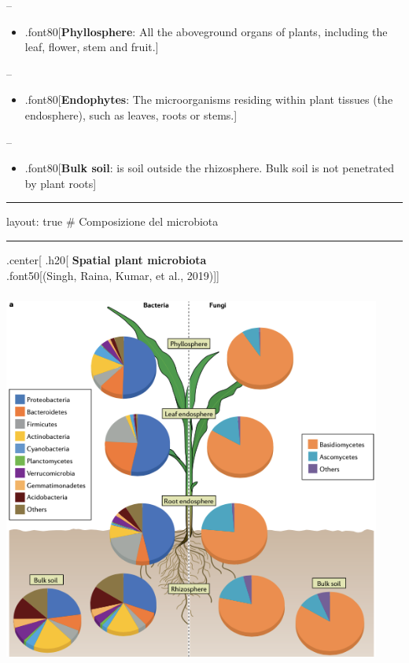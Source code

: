 \documentclass[
]{article}
\providecommand{\tightlist}{%
  \setlength{\itemsep}{0pt}\setlength{\parskip}{0pt}}
\begin{document}
--

\begin{itemize}
\tightlist
\item
  .font80{[}\textbf{Phyllosphere}: All the aboveground organs of plants,
  including the leaf, flower, stem and fruit.{]}
\end{itemize}

--

\begin{itemize}
\tightlist
\item
  .font80{[}\textbf{Endophytes}: The microorganisms residing within
  plant tissues (the endosphere), such as leaves, roots or stems.{]}
\end{itemize}

--

\begin{itemize}
\tightlist
\item
  .font80{[}\textbf{Bulk soil}: is soil outside the rhizosphere. Bulk
  soil is not penetrated by plant roots{]}
\end{itemize}

\begin{center}\rule{0.5\linewidth}{0.5pt}\end{center}

layout: true \# Composizione del microbiota

\begin{center}\rule{0.5\linewidth}{0.5pt}\end{center}

.center{[} .h20{[} \textbf{Spatial plant microbiota}\\
.font50{[}(Singh, Raina, Kumar, et al., 2019){]}{]}

\begin{center}\includegraphics[width=470px,height=470px]{images/PlantMicrobiomeComposition} \end{center}
\end{document}
